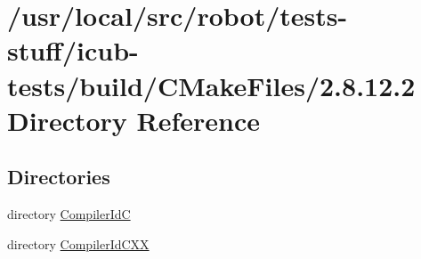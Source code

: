 \section{/usr/local/src/robot/tests-\/stuff/icub-\/tests/build/\-C\-Make\-Files/2.8.12.2 Directory Reference}
\label{dir_97123f7bbb049a6c037d164abeb401cf}
\subsection*{Directories}
\begin{DoxyCompactItemize}
\item 
directory \hyperlink{dir_56255da6c3cb6cad7ffeeae51eefd326}{Compiler\-Id\-C}
\item 
directory \hyperlink{dir_ada8b63fefe23973dfde3e0e2a8ea665}{Compiler\-Id\-C\-X\-X}
\end{DoxyCompactItemize}
